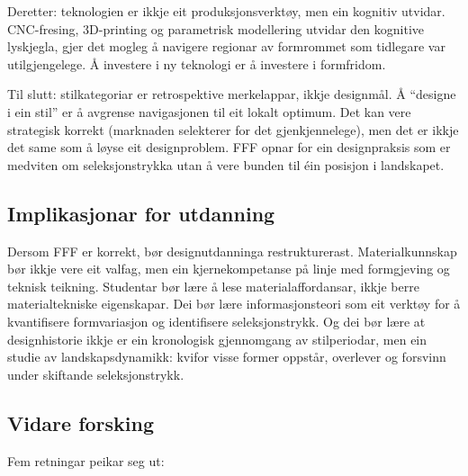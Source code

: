 \documentclass[12pt, a4paper]{article}
\begin{document}
Deretter: teknologien er ikkje eit produksjonsverktøy, men ein kognitiv utvidar. CNC-fresing, 3D-printing og parametrisk modellering utvidar den kognitive lyskjegla, gjer det mogleg å navigere regionar av formrommet som tidlegare var utilgjengelege. Å investere i ny teknologi er å investere i formfridom.

Til slutt: stilkategoriar er retrospektive merkelappar, ikkje designmål. Å ``designe i ein stil'' er å avgrense navigasjonen til eit lokalt optimum. Det kan vere strategisk korrekt (marknaden selekterer for det gjenkjennelege), men det er ikkje det same som å løyse eit designproblem. FFF opnar for ein designpraksis som er medviten om seleksjonstrykka utan å vere bunden til éin posisjon i landskapet.

\subsection{Implikasjonar for utdanning}

Dersom FFF er korrekt, bør designutdanninga restrukturerast. Materialkunnskap bør ikkje vere eit valfag, men ein kjernekompetanse på linje med formgjeving og teknisk teikning. Studentar bør lære å lese materialaffordansar, ikkje berre materialtekniske eigenskapar. Dei bør lære informasjonsteori som eit verktøy for å kvantifisere formvariasjon og identifisere seleksjonstrykk. Og dei bør lære at designhistorie ikkje er ein kronologisk gjennomgang av stilperiodar, men ein studie av landskapsdynamikk: kvifor visse former oppstår, overlever og forsvinn under skiftande seleksjonstrykk.

\subsection{Vidare forsking}

Fem retningar peikar seg ut:
\end{document}
